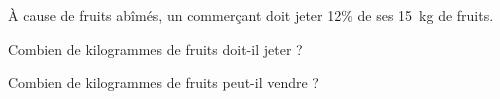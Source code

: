 \`A cause de fruits abîmés, un commerçant doit jeter 12\% de ses
15~kg de fruits.
\begin{myenumerate}
\item Combien de kilogrammes de fruits doit-il jeter ?
\item Combien de kilogrammes de fruits peut-il vendre ?
\end{myenumerate}